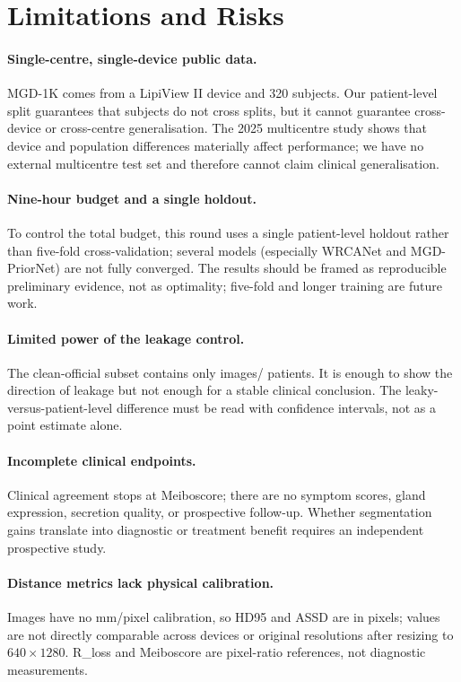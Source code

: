 \section{Limitations and Risks}\label{sec:limitations}

\paragraph{Single-centre, single-device public data.} MGD-1K comes from a LipiView II device and 320 subjects. Our patient-level split guarantees that subjects do not cross splits, but it cannot guarantee cross-device or cross-centre generalisation. The 2025 multicentre study shows that device and population differences materially affect performance\cite{li2025multicenter}; we have no external multicentre test set and therefore cannot claim clinical generalisation.

\paragraph{Nine-hour budget and a single holdout.} To control the total budget, this round uses a single patient-level holdout rather than five-fold cross-validation; several models (especially WRCANet and MGD-PriorNet) are not fully converged. The results should be framed as reproducible preliminary evidence, not as optimality; five-fold and longer training are future work.

\paragraph{Limited power of the leakage control.} The clean-official subset contains only \cleanOfficialImages{} images/\cleanOfficialPatients{} patients. It is enough to show the direction of leakage but not enough for a stable clinical conclusion. The leaky-versus-patient-level difference must be read with confidence intervals, not as a point estimate alone.

\paragraph{Incomplete clinical endpoints.} Clinical agreement stops at Meiboscore; there are no symptom scores, gland expression, secretion quality, or prospective follow-up. Whether segmentation gains translate into diagnostic or treatment benefit requires an independent prospective study.

\paragraph{Distance metrics lack physical calibration.} Images have no mm/pixel calibration, so HD95 and ASSD are in pixels; values are not directly comparable across devices or original resolutions after resizing to $640\times1280$. R\_loss and Meiboscore are pixel-ratio references, not diagnostic measurements.

